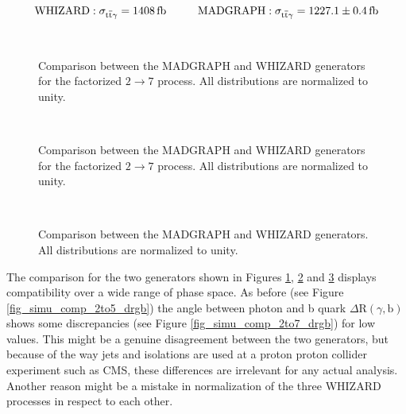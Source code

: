 \begin{equation}
\mathrm{WHIZARD: }\; \sigma_{\ttgamma} = \SI{1408}{\femto \barn} \hspace{1.cm} \mathrm{MADGRAPH: }\; \sigma_{\ttgamma} = \SI{1227.1 \pm 0.4}{\femto \barn}
\label{eq_simu_2to7_cross}
\end{equation}



\begin{figure}
  \\
  \caption{Comparison between the MADGRAPH and WHIZARD generators for the factorized $2 \to 7$ process. All distributions are normalized to unity.}
  \label{fig_simu_comp_2to7_1}
\end{figure}

\begin{figure}
  \\
  \caption{Comparison between the MADGRAPH and WHIZARD generators for the factorized $2 \to 7$ process. All distributions are normalized to unity.}
  \label{fig_simu_comp_2to7_2}
\end{figure}
\begin{figure}
  \\
  \caption{Comparison between the MADGRAPH and WHIZARD generators. All distributions are normalized to unity.}
  \label{fig_simu_comp_2to7_3}
\end{figure}

The comparison for the two generators shown in Figures \ref{fig_simu_comp_2to7_1}, \ref{fig_simu_comp_2to7_2} and \ref{fig_simu_comp_2to7_3} displays compatibility over a wide range of phase space. As before (see Figure \ref{fig_simu_comp_2to5_drgb}) the angle between photon and b quark $\Delta \mathrm{R}(\gamma,\mathrm{b})$ shows some discrepancies (see Figure \ref{fig_simu_comp_2to7_drgb}) for low values. This might be a genuine disagreement between the two generators, but because of the way jets and isolations are used at a proton proton collider experiment such as CMS, these differences are irrelevant for any actual analysis.
Another reason might be a mistake in normalization of the three WHIZARD processes in respect to each other. \\

